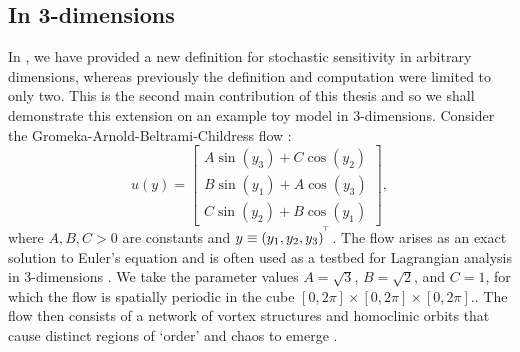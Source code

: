 \subsection{In 3-dimensions}\label{sec:comput_s2_3d}
In , we have provided a new definition for stochastic sensitivity in arbitrary dimensions, whereas previously the definition and computation \citep{Balasuriya_2020_StochasticSensitivityComputable} were limited to only two.
This is the second main contribution of this thesis and so we shall demonstrate this extension on an example toy model in 3-dimensions.
Consider the Gromeka-Arnold-Beltrami-Childress flow \citep{DombreEtAl_1986_ChaoticStreamlinesABC}:
\begin{equation}\label{eqn:gabc}
	u\!\left(y\right) = \begin{bmatrix}
		A\sin\!\left(y_3\right) + C\cos\!\left(y_2\right) \\
		B\sin\!\left(y_1\right) + A\cos\!\left(y_3\right) \\
		C\sin\!\left(y_2\right) + B\cos\!\left(y_1\right)
	\end{bmatrix},
\end{equation}
where \(A, B, C > 0\) are constants and \(y \equiv \left(y_1, y_2, y_3\right)^{^{\!\top}}\).
The flow arises as an exact solution to Euler's equation and is often used as a testbed for Lagrangian analysis in 3-dimensions \citep[e.g.]{NelsonJacobs_2016_HighorderVisualizationThreedimensional,BruntonRowley_2010_FastComputationFinitetime,Haller_2001_DistinguishedMaterialSurfaces,SulmanEtAl_2013_LeavingFlatlandDiagnostics}.
We take the parameter values \(A = \sqrt{3}\), \(B = \sqrt{2}\), and \(C = 1\), for which the flow is spatially periodic in the cube \([0,2\pi] \times [0,2\pi] \times [0,2\pi]\)..
The flow then consists of a network of vortex structures and homoclinic orbits that cause distinct regions of `order' and chaos to emerge \citep{DombreEtAl_1986_ChaoticStreamlinesABC}.


